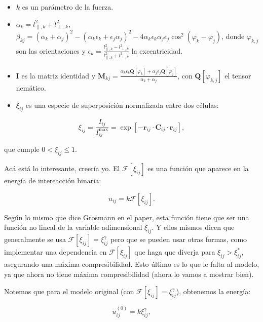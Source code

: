 \documentclass[11pt,a4paper]{article}
\begin{document}
\begin{itemize}
	\item $k$ es un parámetro de la fuerza.
	\item $\alpha_k=l_{\parallel, k}^{2}+l_{\perp, k}^{2}$, $\beta_{kj}=(\alpha_k+\alpha_j)^{2}-(\alpha_k \epsilon_k+\epsilon_j \alpha_j)^{2}-4\alpha_k\epsilon_k\alpha_j\epsilon_j \cos^{2}(\varphi_k-\varphi_j)$, donde $\varphi_{k, j}$ son las orientaciones y $\epsilon_k=\frac{l_{\parallel, k}^{2}-l_{\perp, k}^{2}}{l_{\parallel, k}^{2}+l_{\perp, k}^{2}}$ la excentricidad.
	\item $\mathbf{I}$ es la matriz identidad y $\mathbf{M}_{kj}=\frac{\alpha_k \epsilon_k \mathbf{Q}[\varphi_k]+\alpha_j \epsilon_j \mathbf{Q}[\varphi_j]}{\alpha_k+\alpha_j}$, con $\mathbf{Q}[\varphi_{k, j}]$ el tensor nemático.
	\item $\xi_{ij}$ es una especie de superposición normalizada entre dos células:
\end{itemize}

\begin{equation}
	\xi_{ij}
	=
	\frac{I_{ij}}{I_{ij}^{\max}}
	=
	\exp\left[
	-\mathbf r_{ij}\cdot
	\mathbf C_{ij}\cdot
	\mathbf r_{ij}
	\right],
	\label{eq:normalized_overlap}
\end{equation}

que cumple $0<\xi_{ij}\leq1$.

Acá está lo interesante, creería yo. El $\mathcal{F}[\xi_{ij}]$ es una función que aparece en la energía de intereacción binaria:

\begin{equation}
	u_{ij}
	=
	k\mathcal{F}[\xi_{ij}].
	\label{eq:energy}
\end{equation}

Según lo mismo que dice Grosmann en el paper, esta función tiene que ser una función no lineal de la variable adimensional $\xi_{ij}$. Y ellos mismos dicen que generalmente se usa $\mathcal{F}[\xi_{ij}]=\xi_{ij}^{\gamma}$ pero que se pueden usar otras formas, como implementar una dependencia en $\mathcal{F}[\xi_{ij}]$ que haga que diverja para $\xi_{ij}>\xi_{ij}^{*}$, asegurando una máxima compresibilidad. Esto último es lo que le falta al modelo, ya que ahora no tiene máxima compresibilidad (ahora lo vamos a mostrar bien).

Notemos que para el modelo original (con $\mathcal{F}[\xi_{ij}]=\xi_{ij}^{\gamma}$), obtenemos la energía:

\begin{equation}
u_{ij}^{(0)}
=
k\xi_{ij}^{\gamma},
\label{eq:original_energy}
\end{equation}
\end{document}
